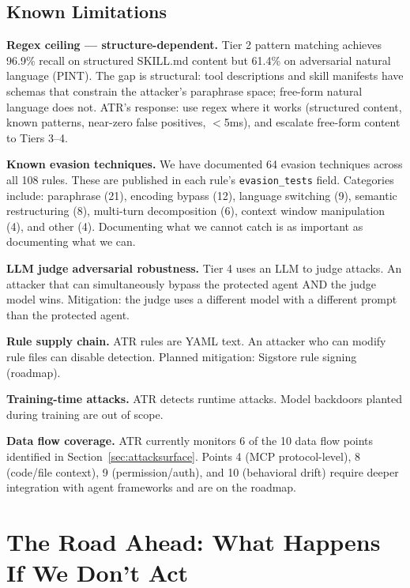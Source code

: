 \documentclass[11pt,letterpaper]{article}
\begin{document}
\subsection{Known Limitations}

\textbf{Regex ceiling --- structure-dependent.} Tier 2 pattern matching achieves 96.9\% recall on structured SKILL.md content but 61.4\% on adversarial natural language (PINT). The gap is structural: tool descriptions and skill manifests have schemas that constrain the attacker's paraphrase space; free-form natural language does not. ATR's response: use regex where it works (structured content, known patterns, near-zero false positives, $<$5ms), and escalate free-form content to Tiers 3--4.

\textbf{Known evasion techniques.} We have documented 64 evasion techniques across all 108 rules. These are published in each rule's \texttt{evasion\_tests} field. Categories include: paraphrase (21), encoding bypass (12), language switching (9), semantic restructuring (8), multi-turn decomposition (6), context window manipulation (4), and other (4). Documenting what we cannot catch is as important as documenting what we can.

\textbf{LLM judge adversarial robustness.} Tier 4 uses an LLM to judge attacks. An attacker that can simultaneously bypass the protected agent AND the judge model wins. Mitigation: the judge uses a different model with a different prompt than the protected agent.

\textbf{Rule supply chain.} ATR rules are YAML text. An attacker who can modify rule files can disable detection. Planned mitigation: Sigstore rule signing (roadmap).

\textbf{Training-time attacks.} ATR detects runtime attacks. Model backdoors planted during training are out of scope.

\textbf{Data flow coverage.} ATR currently monitors 6 of the 10 data flow points identified in Section~\ref{sec:attacksurface}. Points 4 (MCP protocol-level), 8 (code/file context), 9 (permission/auth), and 10 (behavioral drift) require deeper integration with agent frameworks and are on the roadmap.


\section{The Road Ahead: What Happens If We Don't Act}
\label{sec:roadahead}
\end{document}
